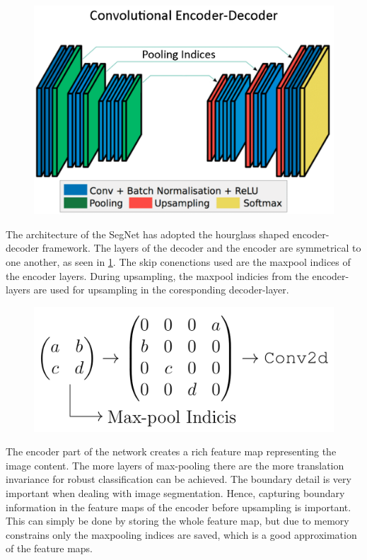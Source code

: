 \documentclass[
]{dtuposter}
\begin{document}
\begin{dtupostercontent}
\begin{figure}
	\centering
	\includegraphics[width=0.8\linewidth]{Structure}
	\caption{}
	\label{fig:Structure}
\end{figure}
The architecture of the SegNet has adopted the hourglass shaped encoder-decoder 
framework. The layers of the decoder and the encoder are symmetrical to one 
another, as seen in \ref{fig:Structure}. The skip conenctions used are the 
maxpool indices of the encoder layers. During upsampling, the maxpool indicies 
from the encoder-layers are used for upsampling in the coresponding 
decoder-layer. 
\begin{figure}
	\centering
	\includegraphics[width=1\linewidth]{pool}
	\label{fig:maxpool}
\end{figure}
The encoder part of the network creates a rich feature map representing the image content. The more 
layers of max-pooling there are the more translation invariance for robust 
classification can be achieved. The boundary detail is very important when 
dealing with image segmentation. Hence, capturing boundary information in 
the feature maps of the encoder before upsampling is important. This can 
simply be done by storing the whole feature map, but due to memory 
constrains only the maxpooling indices are saved, which is a good 
approximation of the feature maps. 

\end{dtupostercontent}
\end{document}
